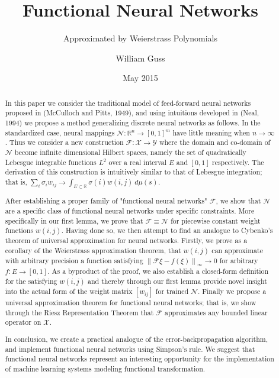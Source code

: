 \documentclass{ib-assignment}
\title{Functional Neural Networks}
\author{William Guss}
\subtitle{Approximated by Weierstrass Polynomials}
\date{May 2015}
\begin{document}
\maketitle

\begin{abstract}
\normalsize
In this paper we consider the traditional model of feed-forward neural networks proposed in (McCulloch and Pitts, 1949), and using intuitions developed in (Neal, 1994) we propose a method generalizing discrete neural networks as follows.
In the standardized case, neural mappings $\mathcal{N}: \mathbb{R}^n \to [0,1]^m$ have little meaning when $n \to \infty$. Thus we consider a new construction $\mathcal{F}: \mathcal{X} \to \mathcal{Y}$ where the domain and co-domain of $\mathcal{N}$ become infinite dimensional Hilbert spaces, namely the set of quadratically Lebesgue integrable functions $L^2$ over a real interval $E$ and $[0,1]$ respectively.
 The derivation of this construction is intuitively similar to that of Lebesgue integration; that is, $\sum_i \sigma_i w_{ij} \to \int_{E\subset\mathbb{R}}\sigma(i)w(i,j)\ d\mu(s)$. 

After establishing a proper family of "functional neural networks" $\mathcal{F}$, we show that $\mathcal{N}$ are a specific class of functional neural networks under specific constraints. More specifically in our first lemma, we prove that $\mathcal{F} \equiv \mathcal{N}$ for piecewise constant weight functions $w(i,j)$. Having done so, we then attempt to find an analogue to Cybenko's theorem of universal approximation for neural networks. Firstly, we prove as a corollary of the Weierstrass approximation theorem, that $w(i,j)$ can approximate with arbitrary precision a function satisfying $\left\|\mathcal{F}\xi - f(\xi)\right\|_\infty \to 0$ for arbitrary $f:E\to[0,1]$. As a byproduct of the proof, we also establish a closed-form definition for the satisfying $w(i,j)$ and thereby through our first lemma provide novel insight into the actual form of the weight matrix $[w_{ij}]$ for trained $\mathcal{N}$. Finally we propose a universal approximation theorem for functional neural networks; that is, we show through the Riesz Representation Theorem that $\mathcal{F}$ approximates any bounded linear operator on $\mathcal{X}$.

In conclusion, we create a practical analogue of the error-backpropagation algorithm, and implement functional neural networks using Simpson’s rule. We suggest that functional neural networks represent an interesting opportunity for the implementation of machine learning systems modeling functional transformation.
\abcount
\end{abstract}
\end{document}
